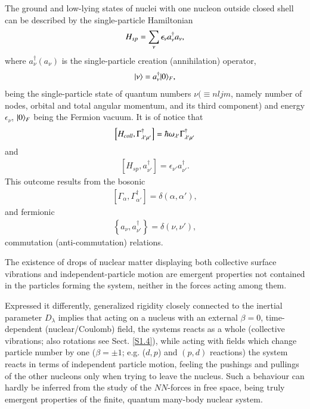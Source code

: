 The ground and low-lying states of nuclei with one nucleon outside closed shell can be described by the single-particle Hamiltonian
\begin{align}\label{eq1.0.10}
H_{sp}=\sum_{\nu}\epsilon_\nu a_\nu^\dagger a_\nu, \idx{Elementary modes of excitation!independent particle motion}
\end{align}
where $a_\nu^\dagger (a_\nu)$ is the single-particle creation (annihilation) operator,
\begin{align}\label{eq1.0.11}
|{\nu} \rangle=a_\nu^\dagger|{0} \rangle_F,
\end{align}
being the single-particle state of quantum numbers $\nu(\equiv nljm$, namely number of nodes, orbital and total angular momentum, and its third component) and energy $\epsilon_\nu$,  $|{0} \rangle_F$ being the Fermion vacuum. 
It is of notice that
\begin{align}\label{eq0.1.14}
\left[H_{coll},\Gamma^\dagger_{\lambda'\mu'}\right]=\hbar\omega_{\lambda'}\Gamma^\dagger_{\lambda'\mu'}\idx{Particle hole vibrations!RPA relations}
\end{align}
and 
\begin{align}\label{eq0.1.15}
\left[H_{sp},a^\dagger_{\nu'}\right]=\epsilon_{\nu'}a^\dagger_{\nu'}.
\end{align}
	This  outcome results from the bosonic
\begin{align}\label{eq0.1.16}
\left[\Gamma_{\alpha},\Gamma^\dagger_{\alpha'}\right]=\delta(\alpha,\alpha'),
\end{align}
	and fermionic
\begin{align}
\left\{a_\nu,a^\dagger_{\nu'}\right\}=\delta(\nu,\nu'),
\end{align}
commutation (anti-commutation) relations.


 The existence of drops of nuclear matter displaying both collective surface vibrations and independent-particle motion  are emergent properties not contained in the particles forming the system, neither in the forces acting among them. 




Expressed it differently, generalized rigidity closely connected to the inertial parameter $D_\lambda$ implies that acting on a nucleus with an external $\beta=0$, time-dependent (nuclear/Coulomb) field, the systems reacts as a whole (collective vibrations; also rotations see Sect. \ref{S1.4}), while acting with fields which change particle number by one ($\beta=\pm1$; e.g. ($d,p$) and $(p,d)$ reactions) the system reacts in terms of independent particle motion, feeling the pushings and pullings of the other nucleons only when trying to leave the nucleus. Such a behaviour can hardly be inferred from the study of the $NN$-forces in free space, being truly emergent properties of the finite, quantum many-body nuclear system.




